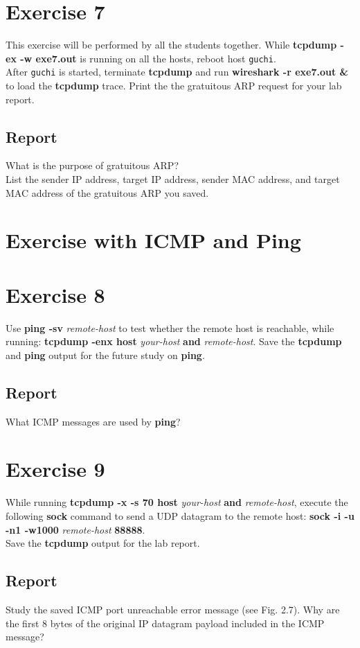 \documentclass[10pt,a4paper]{article}
\numberwithin{equation}{section}
\numberwithin{figure}{section}
\numberwithin{table}{section}
\begin{document}
    \section{ Exercise 7}
    This exercise will be performed by all the students together.
    While \textbf{tcpdump -ex -w exe7.out} is running on all the hosts, reboot host \texttt{guchi}. \\
    After \texttt{guchi} is started, terminate \textbf{tcpdump} and run \textbf{wireshark -r exe7.out \&} to load the \textbf{tcpdump} trace.
    Print the the gratuitous ARP request for your lab report.
    \subsection*{Report}
    What is the purpose of gratuitous ARP? \\
    List the sender IP address, target IP address, sender MAC address, and target MAC address of the gratuitous ARP you saved.


    \section*{Exercise with ICMP and Ping}
    \section{ Exercise 8}
    Use \textbf{ping -sv} \textit{remote-host} to test whether the remote host is reachable, while running: \textbf{tcpdump -enx host} \textit{your-host} \textbf{and} \textit{remote-host}.
    Save the \textbf{tcpdump} and \textbf{ping} output for the future study on \textbf{ping}.
    \subsection*{Report}
    What ICMP messages are used by \textbf{ping}?

    \section{ Exercise 9}
    While running \textbf{tcpdump -x -s 70 host} \textit{your-host} \textbf{and} \textit{remote-host}, execute the following \textbf{sock} command to send a UDP datagram to the remote host: \textbf{sock -i -u -n1 -w1000} \textit{remote-host} \textbf{88888}. \\
    Save the \textbf{tcpdump} output for the lab report.
    \subsection*{Report}
    Study the saved ICMP port unreachable error message (see Fig. 2.7).
    Why are the first 8 bytes of the original IP datagram payload included in the ICMP message?
\end{document}
